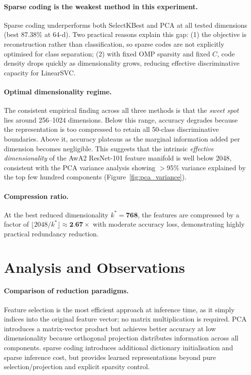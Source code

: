 \documentclass[10pt,letterpaper]{article}
\begin{document}
\paragraph{Sparse coding is the weakest method in this experiment.}
Sparse coding underperforms both SelectKBest and PCA at all tested
dimensions (best 87.38\% at 64-d).
Two practical reasons explain this gap: (1) the objective is reconstruction
rather than classification, so sparse codes are not explicitly optimised for
class separation; (2) with fixed OMP sparsity and fixed $C$, code density
drops quickly as dimensionality grows, reducing effective discriminative
capacity for LinearSVC.

\paragraph{Optimal dimensionality regime.}
The consistent empirical finding across all three methods is that the
\emph{sweet spot} lies around 256--1024
dimensions.
Below this range, accuracy degrades because the representation is too
compressed to retain all 50-class discriminative boundaries.
Above it, accuracy plateaus as the marginal information added per
dimension becomes negligible.
This suggests that the intrinsic \emph{effective dimensionality} of the
AwA2 ResNet-101 feature manifold is well below 2048, consistent with the
PCA variance analysis showing $>$95\% variance explained by the top few
hundred components (Figure~\ref{fig:pca_variance}).

\paragraph{Compression ratio.}
At the best reduced dimensionality $k^* = \textbf{768}$, the features are
compressed by a factor of $\lfloor 2048 / k^* \rfloor \approx
\textbf{2.67}{\times}$ with moderate accuracy loss,
demonstrating highly practical redundancy reduction.

\section{Analysis and Observations}
\label{sec:analysis}

\paragraph{Comparison of reduction paradigms.}
Feature selection is the most efficient approach at inference time, as
it simply indices into the original feature vector; no matrix
multiplication is required.
PCA introduces a matrix-vector product but achieves better accuracy
at low dimensionality because orthogonal projection distributes
information across all components.
sparse coding introduces additional dictionary initialisation and sparse
inference cost, but provides learned representations beyond pure
selection/projection and explicit sparsity control.
\end{document}
